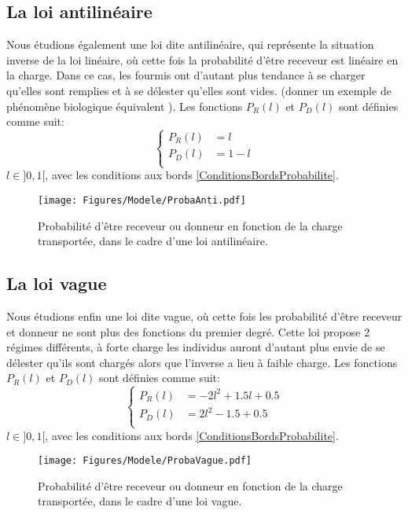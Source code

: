 \subsection{La loi antilinéaire}
Nous étudions également une loi dite antilinéaire, qui représente la situation inverse de la loi linéaire, où cette fois la probabilité d'être receveur est linéaire en la charge. Dans ce cas, les fourmis ont d'autant plus tendance à se charger qu'elles sont remplies et à se délester qu'elles sont vides. (donner un exemple de phénomène biologique équivalent \fixme). Les fonctions $P_R(l)$ et $P_D(l)$ sont définies comme suit:
\begin{equation}
\left \{
\begin{aligned}
P_R (l) &= l\\
P_D (l) &= 1-l\\
\end{aligned}
\right.
\label{PRAnti}
\end{equation}
$l\in]0,1[$, avec les conditions aux bords \ref{ConditionsBordsProbabilite}.

\begin{figure}[h]
\centering
\texttt{[image: Figures/Modele/ProbaAnti.pdf]}
\caption{Probabilité d'être receveur ou donneur en fonction de la charge transportée, dans le cadre d'une loi antilinéaire.}
\label{ProbaAnti}
\end{figure}

\subsection{La loi vague}
Nous étudions enfin une loi dite vague, où cette fois les probabilité d'être receveur et donneur ne sont plus des fonctions du premier degré. Cette loi propose 2 régimes différents, à forte charge les individus auront d'autant plus envie de se délester qu'ils sont chargés alors que l'inverse a lieu à faible charge. Les fonctions $P_R(l)$ et $P_D(l)$ sont définies comme suit:
\begin{equation}
\left \{
\begin{aligned}
P_R (l) &= -2l^2+1.5l+0.5\\
P_D (l) &= 2l^2-1.5+0.5\\
\end{aligned}
\right.
\label{PRVague}
\end{equation}
$l\in]0,1[$, avec les conditions aux bords \ref{ConditionsBordsProbabilite}.

\begin{figure}[h]
\centering
\texttt{[image: Figures/Modele/ProbaVague.pdf]}
\caption{Probabilité d'être receveur ou donneur en fonction de la charge transportée, dans le cadre d'une loi vague.}
\label{ProbaVague}
\end{figure}

